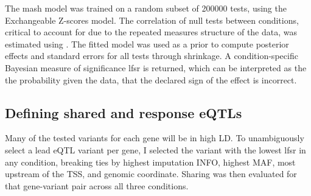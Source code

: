 The mash model was trained on a random subset of 200000 tests, using the Exchangeable Z-scores model\autocite{urbut2018FlexibleStatisticalMethods}.
The correlation of null tests between conditions, critical to account for due to the repeated measures structure of the data, was estimated using .
The fitted model was used as a prior to compute posterior effects and standard errors for all tests through shrinkage.
%
A condition-specific Bayesian measure of significance \gls{lfsr} is returned, which can be interpreted as the the probability given the data, that the declared sign of the effect is incorrect.

\subsection{Defining shared and response eQTLs}

Many of the tested variants for each gene will be in high \gls{LD}.
To unambiguously select a lead \gls{eQTL} variant per gene, I selected the variant with the lowest lfsr in any condition, 
breaking ties by highest imputation INFO, highest \gls{MAF}, most upstream of the \gls{TSS}, and genomic coordinate.
Sharing was then evaluated for that gene-variant pair across all three conditions.

